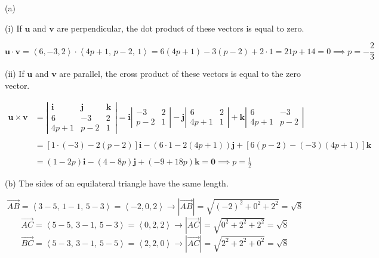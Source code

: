 \documentclass{article}
\begin{document}
\hfill

\noindent (a)

\hfill

\noindent (i) If $\mathbf u$ and $\mathbf v$ are perpendicular, the dot product of these vectors is equal to zero.

\[\mathbf u\cdot\mathbf v=\left\langle6,-3,2\right\rangle\cdot\left\langle4p+1,\,p-2,\,1\right\rangle=6(4p+1)-3(p-2)+2\cdot1=21p+14=0\implies p=\boxed{-\frac23}\]

\hfill

\noindent (ii) If $\mathbf u$ and $\mathbf v$ are parallel, the cross product of these vectors is equal to the zero vector.

\begin{align*}\mathbf{u}\times\mathbf{v}&=\left|\begin{array}{ccc}
\mathbf{i}&\mathbf{j}&\mathbf{k}\\
6&-3&2\\
4p+1&p-2&1
\end{array}\right|=\mathbf{i}\left|\begin{array}{cc}
-3&2\\p-2&1
\end{array}\right|-\mathbf{j}\left|\begin{array}{cc}
6&2\\4p+1&1
\end{array}\right|+\mathbf{k}\left|\begin{array}{cc}
6&-3\\4p+1&p-2
\end{array}\right|\\\\&=[1\cdot(-3)-2(p-2)]\mathbf i-(6\cdot1-2(4p+1))\mathbf j+[6(p-2)-(-3)(4p+1)]\mathbf k\\\\&=(1-2p)\mathbf i-(4-8p)\mathbf j+(-9+18p)\mathbf k=\mathbf0\implies \boxed{p=\frac12}\end{align*}

\hfill

\noindent (b) The sides of an equilateral triangle have the same length.

\[\overrightarrow{AB}=\left\langle3-5,\,1-1,\,5-3\right\rangle=\left\langle-2,0,2\right\rangle\rightarrow\left|\overrightarrow{AB}\right|=\sqrt{(-2)^2+0^2+2^2}=\sqrt8\]
\[\overrightarrow{AC}=\left\langle5-5,\,3-1,\,5-3\right\rangle=\left\langle0,2,2\right\rangle\rightarrow\left|\overrightarrow{AC}\right|=\sqrt{0^2+2^2+2^2}=\sqrt8\]
\[\overrightarrow{BC}=\left\langle5-3,\,3-1,\,5-5\right\rangle=\left\langle2,2,0\right\rangle\rightarrow\left|\overrightarrow{AC}\right|=\sqrt{2^2+2^2+0^2}=\sqrt8\]
\end{document}
